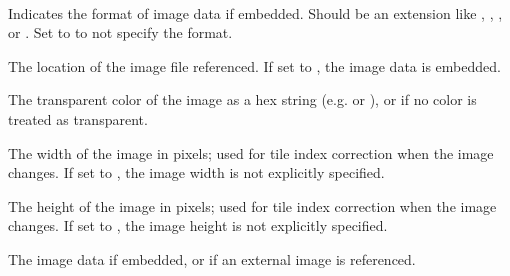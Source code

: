\documentclass[letterpaper,10pt,english]{sphinxmanual}
\begin{document}
\begin{fulllineitems}
\label{index:tmx.Image}~

\begin{fulllineitems}
\label{index:tmx.Image.format}
Indicates the format of image data if embedded.  Should be an
extension like , , , or .
Set to  to not specify the format.

\end{fulllineitems}


\begin{fulllineitems}
\label{index:tmx.Image.source}
The location of the image file referenced.  If set to
, the image data is embedded.

\end{fulllineitems}


\begin{fulllineitems}
\label{index:tmx.Image.trans}
The transparent color of the image as a hex string (e.g.
 or ), or  if no color is
treated as transparent.

\end{fulllineitems}


\begin{fulllineitems}
\label{index:tmx.Image.width}
The width of the image in pixels; used for tile index correction
when the image changes.  If set to , the image width
is not explicitly specified.

\end{fulllineitems}


\begin{fulllineitems}
\label{index:tmx.Image.height}
The height of the image in pixels; used for tile index correction
when the image changes.  If set to , the image
height is not explicitly specified.

\end{fulllineitems}


\begin{fulllineitems}
\label{index:tmx.Image.data}
The image data if embedded, or  if an external image
is referenced.

\end{fulllineitems}


\end{fulllineitems}
\end{document}
